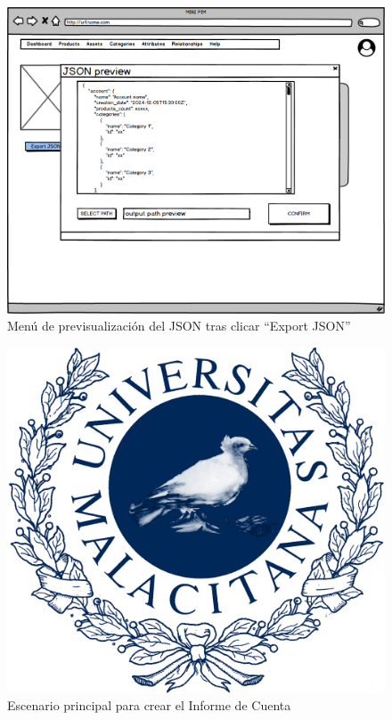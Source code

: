 \begin{figure}[H]
    \includegraphics[width=1\linewidth]{assets/mockups/RF1.9.1ExportarInformeCuenta.png}
    \caption{Menú de previsualización del JSON tras clicar \enquote{Export JSON}}
   \end{figure}
\vspace{1.0cm}

\newpage %

\begin{figure}[H]
    \includegraphics[width=1\linewidth]{assets/umaLogo.png}
    \caption{Escenario principal para crear el Informe de Cuenta}
   \end{figure}
\vspace{1.0cm}

\newpage %